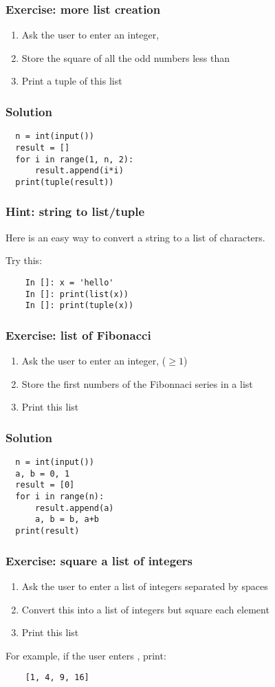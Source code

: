 \documentclass[14pt,compress]{beamer}
\begin{document}
\begin{frame}[plain]
  \frametitle{Exercise: more list creation}
  \begin{enumerate}
  \item Ask the user to enter an integer, 
  \item Store the square of all the odd numbers less than 
  \item Print a tuple of this list
  \end{enumerate}
\end{frame}

\begin{frame}
\frametitle{Solution}
\begin{lstlisting}
  n = int(input())
  result = []
  for i in range(1, n, 2):
      result.append(i*i)
  print(tuple(result))
\end{lstlisting}
\end{frame}


\begin{frame}
  \frametitle{Hint: string to list/tuple}
  Here is an easy way to convert a string to a list of characters.

  Try this:
  \begin{lstlisting}
    In []: x = 'hello'
    In []: print(list(x))
    In []: print(tuple(x))
  \end{lstlisting}
\end{frame}

\begin{frame}[plain]
  \frametitle{Exercise: list of Fibonacci}
  \begin{enumerate}
  \item Ask the user to enter an integer,  ($\geq 1$)
  \item Store the first  numbers of the Fibonnaci series in a list
  \item Print this list
  \end{enumerate}
\end{frame}

\begin{frame}
\frametitle{Solution}
\begin{lstlisting}
  n = int(input())
  a, b = 0, 1
  result = [0]
  for i in range(n):
      result.append(a)
      a, b = b, a+b
  print(result)
\end{lstlisting}
\end{frame}

\begin{frame}
  \frametitle{Exercise: square a list of integers}
  \begin{enumerate}
  \item Ask the user to enter a list of integers separated by spaces
  \item Convert this into a list of integers but square each element
  \item Print this list
  \end{enumerate}
  For example, if the user enters , print:
  \begin{lstlisting}
    [1, 4, 9, 16]
  \end{lstlisting}
\end{frame}
\end{document}
